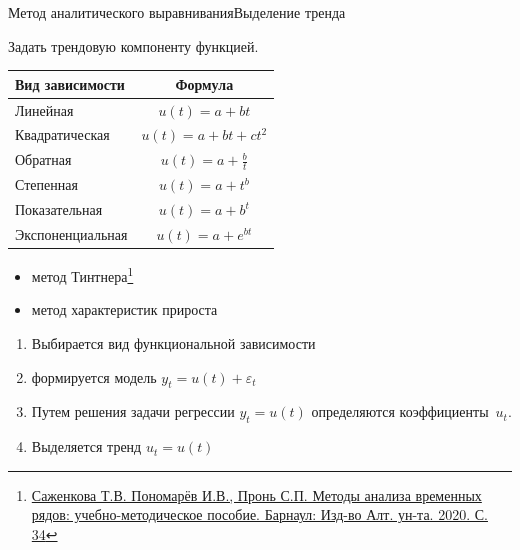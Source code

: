 \documentclass[10pt,pdf,utf8,hyperref={unicode},aspectratio=169]{beamer}
\begin{document}
\begin{frame}{Метод аналитического выравнивания}{Выделение тренда}
	\begin{multicols}{2}
	 Задать трендовую компоненту функцией.
	
	\medskip
	
	{\centering
	\renewcommand{\arraystretch}{1.2}	
	\begin{tabular}{lc}
		Вид зависимости & Формула\\
		\hline
		Линейная & $u(t) = a+bt$\\
		Квадратическая& $u(t) = a+bt+ct^2$\\
		Обратная & $u(t) = a+\frac{b}{t}$\\
		Степенная & $u(t) = a+t^b$\\
		Показательная & $u(t) = a+b^t$\\
		Экспоненциальная & $u(t) = a+e^{bt}$\\
	\end{tabular}
	\par}
	\columnbreak
	\begin{itemize}
		\item метод Тинтнера\footnote{\href{http://elibrary.asu.ru/xmlui/bitstream/handle/asu/8717/book.pdf}{Саженкова Т.В.  Пономарёв И.В., Пронь 	С.П. Методы анализа временных рядов: учебно-методическое пособие. Барнаул: Изд-во Алт. ун-та. 2020. С. 34}}
	\item метод характеристик прироста 
	\end{itemize}

	\bigskip
	\begin{enumerate}
		\item Выбирается вид функциональной зависимости 
		\item формируется модель $y_t  = u(t) + \varepsilon_t$
		\item Путем решения задачи регрессии $y_t=u(t)$ определяются коэффициенты~$u_{t}$.
		\item Выделяется тренд $u_t = u(t)$
	\end{enumerate}
	\end{multicols}
	
	
\end{frame}
\end{document}
